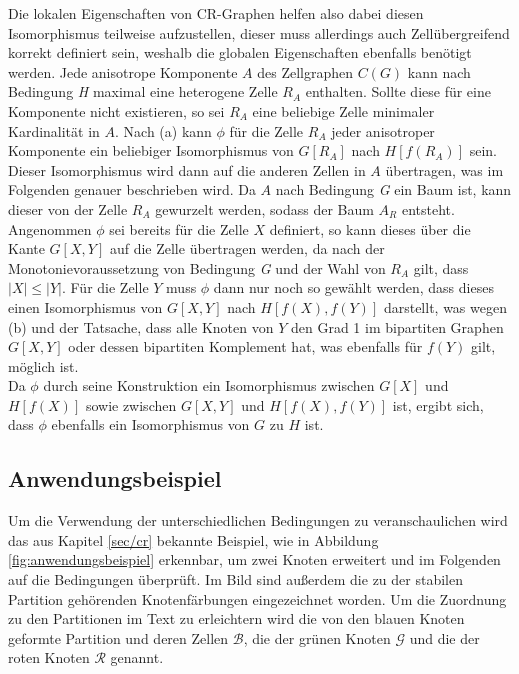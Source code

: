 Die lokalen Eigenschaften von CR-Graphen helfen also dabei diesen Isomorphismus teilweise aufzustellen, dieser muss allerdings auch Zellübergreifend korrekt definiert sein, weshalb die globalen Eigenschaften ebenfalls benötigt werden.
Jede anisotrope Komponente $A$ des Zellgraphen $C(G)$ kann nach Bedingung \emph{H} maximal eine heterogene Zelle $R_A$ enthalten.
Sollte diese für eine Komponente nicht existieren, so sei $R_A$ eine beliebige Zelle minimaler Kardinalität in $A$.
Nach (a) kann $\phi$ für die Zelle $R_A$ jeder anisotroper Komponente ein beliebiger Isomorphismus von $G[R_A]$ nach $H[f(R_A)]$ sein.
Dieser Isomorphismus wird dann auf die anderen Zellen in $A$ übertragen, was im Folgenden genauer beschrieben wird.
Da $A$ nach Bedingung \emph{G} ein Baum ist, kann dieser von der Zelle $R_A$ gewurzelt werden, sodass der Baum $A_R$ entsteht.
Angenommen $\phi$ sei bereits für die Zelle $X$ definiert, so kann dieses über die Kante $G[X,Y]$ auf die Zelle übertragen werden, da nach der Monotonievoraussetzung von Bedingung \emph{G} und der Wahl von $R_A$ gilt, dass $|X|\leq |Y|$.
Für die Zelle $Y$ muss $\phi$ dann nur noch so gewählt werden, dass dieses einen Isomorphismus von $G[X,Y]$ nach $H[f(X),f(Y)]$ darstellt, was wegen (b) und der Tatsache, dass alle Knoten von $Y$ den Grad 1 im bipartiten Graphen $G[X,Y]$ oder dessen bipartiten Komplement hat, was ebenfalls für $f(Y)$ gilt, möglich ist.\\

Da $\phi$ durch seine Konstruktion ein Isomorphismus zwischen $G[X]$ und $H[f(X)]$ sowie zwischen $G[X,Y]$ und $H[f(X),f(Y)]$ ist, ergibt sich, dass $\phi$ ebenfalls ein Isomorphismus von $G$ zu $H$ ist.

\subsection{Anwendungsbeispiel}
\label{sec/anwendungsbeispiel}
Um die Verwendung der unterschiedlichen Bedingungen zu veranschaulichen wird das aus Kapitel \ref{sec/cr} bekannte Beispiel, wie in Abbildung \ref{fig:anwendungsbeispiel} erkennbar, um zwei Knoten erweitert und im Folgenden auf die Bedingungen überprüft.
Im Bild sind außerdem die zu der stabilen Partition gehörenden Knotenfärbungen eingezeichnet worden.
Um die Zuordnung zu den Partitionen im Text zu erleichtern wird die von den blauen Knoten geformte Partition und deren Zellen $\mathcal{B}$, die der grünen Knoten $\mathcal{G}$ und die der roten Knoten $\mathcal{R}$ genannt.

